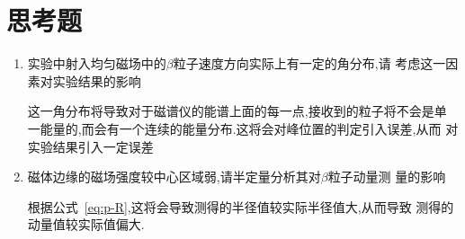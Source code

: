 \documentclass[aps,pre,12pt,preprint,onecolumn,showpacs,showkeys]{revtex4-1}
\begin{document}
\clearpage
\appendix
\section{思考题}

\begin{enumerate}
\item 实验中射入均匀磁场中的$\beta$粒子速度方向实际上有一定的角分布,请
  考虑这一因素对实验结果的影响

  这一角分布将导致对于磁谱仪的能谱上面的每一点,接收到的粒子将不会是单
  一能量的,而会有一个连续的能量分布.这将会对峰位置的判定引入误差,从而
  对实验结果引入一定误差

\item 磁体边缘的磁场强度较中心区域弱,请半定量分析其对$\beta$粒子动量测
  量的影响

  根据公式~\ref{eq:p-R},这将会导致测得的半径值较实际半径值大,从而导致
  测得的动量值较实际值偏大.
\end{enumerate}
\end{document}
